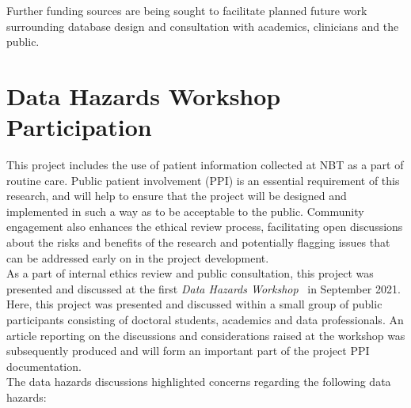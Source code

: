 \documentclass{article}
\begin{document}
Further funding sources are being sought to facilitate planned future
work surrounding database design and consultation with academics,
clinicians and the public.

\section{Data Hazards Workshop Participation}

This project includes the use of patient information collected at NBT as a part
of routine care. Public patient involvement (PPI) is an essential
requirement of this research, and will help to ensure that the project
will be designed and implemented in such a way as to be acceptable to
the public. Community engagement also enhances the ethical
review process, facilitating open discussions about the risks and
benefits of the research and potentially flagging issues that can be
addressed early on in the project development.\\

As a part of internal ethics review and public consultation, this
project was presented and discussed at the first \textit{Data Hazards
  Workshop}~\cite{data-hazards-workshop} in September 2021. Here, this
project was presented and discussed within a small group of public
participants consisting of doctoral students, academics and data
professionals. An article
reporting on the discussions and considerations raised at the
workshop was subsequently produced and will form an important part of
the project PPI documentation.\\

The data hazards discussions highlighted concerns regarding the
following data hazards:
\end{document}
